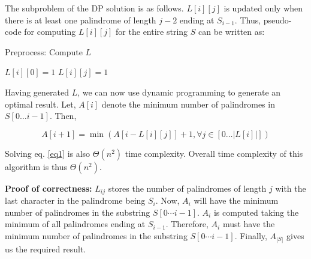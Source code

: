 \documentclass[assign]{article}
\begin{document}
\noindent The subproblem of the DP solution is as follows. $L[i][j]$ is updated only when there is at least one palindrome of length $j-2$ ending at $S_{i-1}$. Thus, pseudo-code for computing $L[i][j]$ for the entire string $S$ can be written as:

\begin{algorithm}[H]
   \caption{{\sc Preprocess:} Compute $L$}
  $L[i][0] = 1 $\;
    {
         {
                {  
                  $L[i][j] = 1$\;  
               } 
         }
    }
\end{algorithm}

\noindent Having generated $L$, we can now use dynamic programming to generate an optimal result. Let, $A[i]$ denote the minimum number of palindromes in $S[0 \ldots i-1]$. Then,

\vspace{-10pt}
\begin{equation}
    A[i+1] = \min{(A[i-L[i][j]] + 1, \forall j \in [0 \ldots \left | L[i] \right |] )} 
\label{eq1}
\end{equation}

\noindent Solving eq. \ref{eq1} is also $\Theta(n^2)$ time complexity. Overall time complexity of this algorithm is thus $\Theta(n^2)$.

\noindent \textbf{Proof of correctness:} $L_{ij}$ stores the number of palindromes of length $j$ with the last character in the palindrome being $S_i$. Now, $A_i$ will have the minimum number of palindromes in the substring $S[0 \cdots i-1]$. $A_i$ is computed taking the minimum of all palindromes ending at $S_{i-1}$. Therefore, $A_i$ must have the minimum number of palindromes in the substring $S[0 \cdots i-1]$. Finally, $A_{|S|}$ gives us the required result.

\vspace{10pt}
\end{document}
